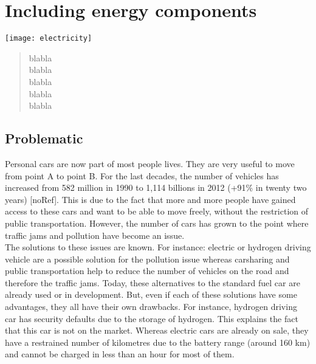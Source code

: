 \chapter{Including energy components} \label{chap:energy}
\begin{bibunit}[ieeetr]
\minitoc
\vspace{2cm}

\begin{minipage}[c]{.3\linewidth}
\texttt{[image: electricity]}
\end{minipage}
\hfill
\begin{minipage}[c]{.7\linewidth}
\begin{abstract}
blabla\\
blabla\\
blabla\\
blabla\\
blabla\\
\end{abstract}
\end{minipage}

\newpage
\section{Problematic}
Personal cars are now part of most people lives.
They are very useful to move from point A to point B.
For the last decades, the number of vehicles has increased from 582 million in 1990 to 1,114 billions in 2012 (+91\% in twenty two years) [noRef].
This is due to the fact that more and more people have gained access to these cars and want to be able to move freely, without the restriction of public transportation.
However, the number of cars has grown to the point where traffic jams and pollution have become an issue.\\

The solutions to these issues are known.
For instance: electric or hydrogen driving vehicle are a possible solution for the pollution issue whereas carsharing and public transportation help to reduce the number of vehicles on the road and therefore the traffic jams.
Today, these alternatives to the standard fuel car are already used or in development.
But, even if each of these solutions have some advantages, they all have their own drawbacks.
For instance, hydrogen driving car has security defaults due to the storage of hydrogen.
This explains the fact that this car is not on the market.
Whereas electric cars are already on sale, they have a restrained number of kilometres due to the battery range (around 160 km) and cannot be charged in less than an hour for most of them.


\end{bibunit}
